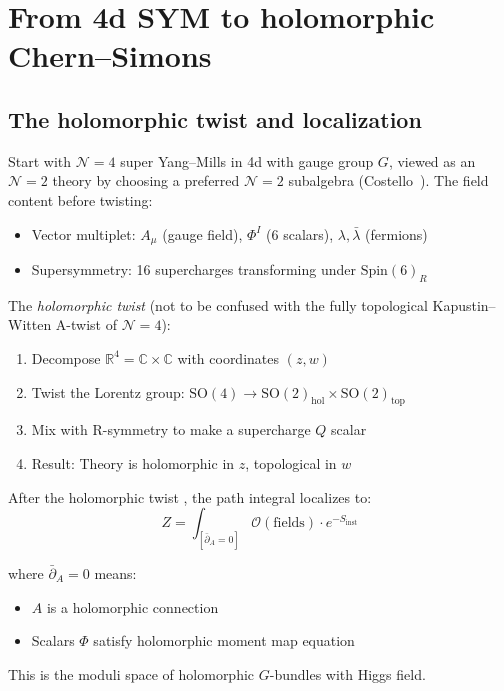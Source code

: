 \section{From 4d SYM to holomorphic Chern--Simons}

\subsection{The holomorphic twist and localization}

\begin{definition}[Holomorphic twist of 4d \texorpdfstring{$\mathcal{N}=4$}{N=4} SYM]
Start with $\mathcal{N}=4$ super Yang--Mills in 4d with gauge group $G$, viewed as an $\mathcal{N}=2$ theory by choosing a preferred $\mathcal{N}=2$ subalgebra (Costello~\cite{costello-renormalization}).  The field content before twisting:
\begin{itemize}
\item Vector multiplet: $A_\mu$ (gauge field), $\Phi^I$ (6 scalars), $\lambda, 
\bar{\lambda}$ (fermions)
\item Supersymmetry: 16 supercharges transforming under $\text{Spin}(6)_R$
\end{itemize}

The \emph{holomorphic twist} (not to be confused with the fully topological Kapustin--Witten A-twist of $\mathcal{N}=4$):
\begin{enumerate}
\item Decompose $\mathbb{R}^4 = \mathbb{C} \times \mathbb{C}$ with coordinates 
$(z, w)$
\item Twist the Lorentz group: $\text{SO}(4) \to \text{SO}(2)_{\text{hol}} \times 
\text{SO}(2)_{\text{top}}$
\item Mix with R-symmetry to make a supercharge $Q$ scalar
\item Result: Theory is holomorphic in $z$, topological in $w$
\end{enumerate}
\end{definition}

\begin{theorem}\label{thm:ht-localization}
After the holomorphic twist \cite{costello-renormalization}, the path integral localizes to:
\[Z = \int_{[\bar{\partial}_A = 0]} \mathcal{O}(\text{fields}) \cdot e^{-S_{\text{inst}}}\]

where $\bar{\partial}_A = 0$ means:
\begin{itemize}
\item $A$ is a holomorphic connection
\item Scalars $\Phi$ satisfy holomorphic moment map equation
\end{itemize}

This is the moduli space of holomorphic $G$-bundles with Higgs field.
\end{theorem}

